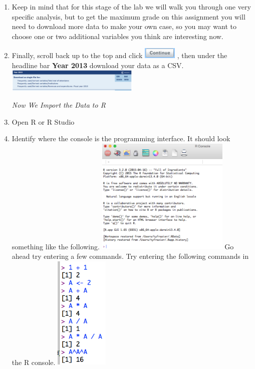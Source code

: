 \documentclass{article}
\newcommand{\proglang}[1]{\textsf{#1}}
\begin{document}
{\begin{enumerate}[leftmargin=15mm]
\item Keep in mind that for this stage of the lab we will walk you through one very specific analysis, but to get the maximum grade on this assignment you will need to download more data to make your own case, so you may want to choose one or two additional variables you think are interesting now.

\item Finally, scroll back up to the top and click \includegraphics[width=0.125\textwidth]{continue2.png} , then under the headline bar \textbf{Year 2013} download your data as a CSV. \includegraphics[width=0.5\textwidth]{csv.png}


\vspace{4mm}
\setlength{\leftskip}{0cm}
\textit{Now We Import the Data to R}

\item Open \proglang{R} or R Studio

\item Identify where the console is the programming interface.  It should look something like the following.  \includegraphics[width=0.5\textwidth]{console.png}  Go ahead try entering a few commands.  Try entering the following commands in the R console.  \includegraphics[width=0.2\textwidth]{A.png}


\end{enumerate}}
\end{document}
